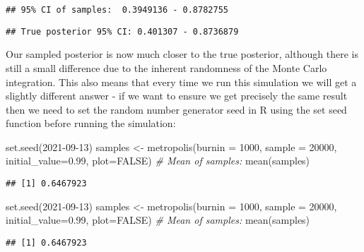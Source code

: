 \documentclass[
  12pt,
]{article}
\newenvironment{Shaded}{\begin{snugshade}}{\end{snugshade}}
\newcommand{\AttributeTok}[1]{\textcolor[rgb]{0.77,0.63,0.00}{#1}}
\newcommand{\CommentTok}[1]{\textcolor[rgb]{0.56,0.35,0.01}{\textit{#1}}}
\newcommand{\ConstantTok}[1]{\textcolor[rgb]{0.00,0.00,0.00}{#1}}
\newcommand{\DecValTok}[1]{\textcolor[rgb]{0.00,0.00,0.81}{#1}}
\newcommand{\FloatTok}[1]{\textcolor[rgb]{0.00,0.00,0.81}{#1}}
\newcommand{\FunctionTok}[1]{\textcolor[rgb]{0.00,0.00,0.00}{#1}}
\newcommand{\NormalTok}[1]{#1}
\newcommand{\OtherTok}[1]{\textcolor[rgb]{0.56,0.35,0.01}{#1}}
\begin{document}
\begin{verbatim}
## 95% CI of samples:  0.3949136 - 0.8782755
\end{verbatim}

\begin{verbatim}
## True posterior 95% CI: 0.401307 - 0.8736879
\end{verbatim}

Our sampled posterior is now much closer to the true posterior, although
there is still a small difference due to the inherent randomness of the
Monte Carlo integration. This also means that every time we run this
simulation we will get a slightly different answer - if we want to
ensure we get precisely the same result then we need to set the random
number generator seed in R using the set seed function before running
the simulation:

\begin{Shaded}
\begin{Highlighting}[]
\FunctionTok{set.seed}\NormalTok{(}\DecValTok{2021{-}09{-}13}\NormalTok{)}
\NormalTok{samples }\OtherTok{\textless{}{-}} \FunctionTok{metropolis}\NormalTok{(}\AttributeTok{burnin =} \DecValTok{1000}\NormalTok{, }\AttributeTok{sample =} \DecValTok{20000}\NormalTok{,}
                      \AttributeTok{initial\_value=}\FloatTok{0.99}\NormalTok{, }\AttributeTok{plot=}\ConstantTok{FALSE}\NormalTok{)}
\CommentTok{\# Mean of samples:}
\FunctionTok{mean}\NormalTok{(samples)}
\end{Highlighting}
\end{Shaded}

\begin{verbatim}
## [1] 0.6467923
\end{verbatim}

\begin{Shaded}
\begin{Highlighting}[]
\FunctionTok{set.seed}\NormalTok{(}\DecValTok{2021{-}09{-}13}\NormalTok{)}
\NormalTok{samples }\OtherTok{\textless{}{-}} \FunctionTok{metropolis}\NormalTok{(}\AttributeTok{burnin =} \DecValTok{1000}\NormalTok{, }\AttributeTok{sample =} \DecValTok{20000}\NormalTok{,}
                      \AttributeTok{initial\_value=}\FloatTok{0.99}\NormalTok{, }\AttributeTok{plot=}\ConstantTok{FALSE}\NormalTok{)}
\CommentTok{\# Mean of samples:}
\FunctionTok{mean}\NormalTok{(samples)}
\end{Highlighting}
\end{Shaded}

\begin{verbatim}
## [1] 0.6467923
\end{verbatim}
\end{document}
